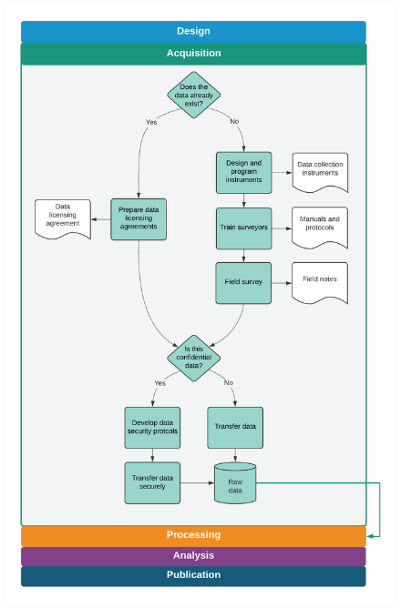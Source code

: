 \begin{fullwidth}
	\begin{figure}
		\centering
		\includegraphics[width=1.5\linewidth]{diagrams/Acquisition}
	\end{figure}
\end{fullwidth}
